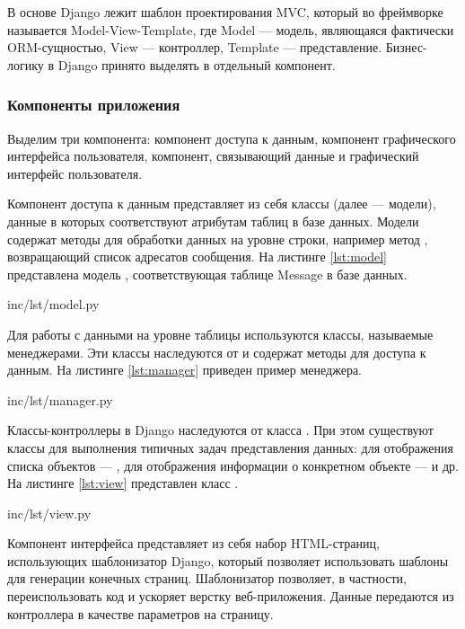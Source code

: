 В основе Django лежит шаблон проектирования MVC, который во фреймворке называется Model-View-Template, где Model --- модель, являющаяся фактически ORM-сущностью, View --- контроллер, Template --- представление. Бизнес-логику в Django принято выделять в отдельный компонент.

\subsubsection{Компоненты приложения}

Выделим три компонента: компонент доступа к данным, компонент графического интерфейса пользователя, компонент, связывающий данные и графический интерфейс пользователя.

Компонент доступа к данным представляет из себя классы  (далее — модели), данные в которых соответствуют атрибутам таблиц в базе данных. Модели содержат методы для обработки данных на уровне строки, например метод , возвращающий список адресатов сообщения. На листинге \ref{lst:model} представлена модель , соответствующая таблице Message в базе данных.

 {inc/lst/model.py}

Для работы с данными на уровне таблицы используются классы, называемые менеджерами. Эти классы наследуются от  и содержат методы для доступа к данным. На листинге \ref{lst:manager} приведен пример менеджера.

 {inc/lst/manager.py}

Классы-контроллеры в Django наследуются от класса . При этом существуют классы для выполнения типичных задач представления данных: для отображения списка объектов --- , для отображения информации о конкретном объекте ---  и др. На листинге \ref{lst:view} представлен класс .

 {inc/lst/view.py}

Компонент интерфейса представляет из себя набор HTML-страниц, использующих шаблонизатор Django, который позволяет использовать шаблоны для генерации конечных страниц. Шаблонизатор позволяет, в частности, переиспользовать код и ускоряет верстку веб-приложения. Данные передаются из контроллера в качестве параметров на страницу.

